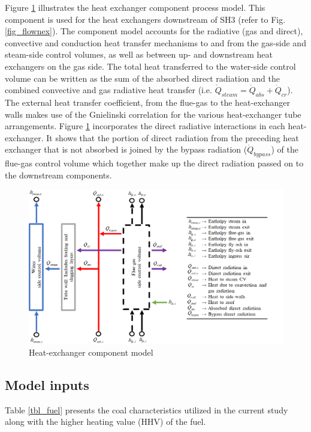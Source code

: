 \documentclass[twocolumn,10pt]{asme2ej}
\begin{document}
Figure \ref{fig_heat_exchanger_model} illustrates the heat exchanger component process model. This component is used for the heat exchangers downstream of SH3 (refer to Fig. \ref{fig_flownex}). The component model accounts for the radiative (gas and direct), convective and conduction heat transfer mechanisms to and from the gas-side and steam-side control volumes, as well as between up- and downstream heat exchangers on the gas side. The total heat transferred to the water-side control volume can be written as the sum of the absorbed direct radiation and the combined convective and gas radiative heat transfer (i.e. $\dot{Q}_{steam}=\dot{Q}_{abs}+\dot{Q}_{cr}$). The external heat transfer coefficient, from the flue-gas to the heat-exchanger walls makes use of the Gnielinski correlation \cite{Gnielinski2016} for the various heat-exchanger tube arrangements. Figure \ref{fig_heat_exchanger_model} incorporates the direct radiative interactions in each heat-exchanger. It shows that the portion of direct radiation from the preceding heat exchanger that is not absorbed is joined by the bypass radiation ($\dot{Q}_{bypass}$) of the flue-gas control volume which together make up  the direct radiation passed on to the downstream components.
\begin{figure}[h!]
\centerline{\includegraphics[scale=0.4]{HEAT_EXCHANGER_PROCESS_MODEL}}
\caption{Heat-exchanger component model}
\label{fig_heat_exchanger_model}
\end{figure}

\subsection{Model inputs}
Table \ref{tbl_fuel} presents the coal characteristics utilized in the current study along with the higher heating value (HHV) of the fuel.
\end{document}
